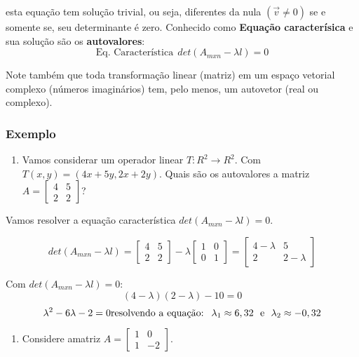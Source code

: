\documentclass[
]{book}
\providecommand{\tightlist}{%
  \setlength{\itemsep}{0pt}\setlength{\parskip}{0pt}}
\begin{document}
esta equação tem solução trivial, ou seja, diferentes da nula \((\vec{v}\neq 0 )\) se e somente se, seu determinante é zero. Conhecido como \textbf{Equação caracterísica} e sua solução são os \textbf{autovalores}:
\begin{equation}
    \mbox{Eq. Característica}\ \  det(A_{mxn}-\lambda l)=0  
    \label{eq:eqcarac}
\end{equation}

Note também que toda transformação linear (matriz) em um espaço
vetorial complexo (números imaginários) tem, pelo menos, um autovetor (real ou complexo).

\hypertarget{exautovetor1}{%
\subsubsection{Exemplo}\label{exautovetor1}}

\begin{enumerate}
\def\labelenumi{\arabic{enumi}.}
\tightlist
\item
  Vamos considerar um operador linear \textbf{\(T: R^2 \rightarrow R^2\)}. Com \(T(x,y)=(4x+5y,2x+2y)\). Quais são os autovalores a matriz \(A=\begin{bmatrix} 4 &5 \\ 2 &2 \end{bmatrix}\)?
\end{enumerate}

Vamos resolver a equação característica \(det(A_{mxn}-\lambda l)=0\).

\[det(A_{mxn}-\lambda l)=\begin{bmatrix}
4 &5 \\ 
2 &2 
\end{bmatrix} - \lambda \begin{bmatrix}
1 &0 \\ 
0 &1 
\end{bmatrix} = \begin{bmatrix}
4-\lambda &5 \\ 
2 &2-\lambda 
\end{bmatrix}\]

Com \(det(A_{mxn}-\lambda l)=0:\)
\[(4-\lambda)(2-\lambda)-10=0 \]
\[\lambda^2-6\lambda-2=0 \\ \mbox{resolvendo a equação: } \ 
\lambda_1 \approx 6,32 \  \ \mbox{e} \ \ \lambda_2 \approx -0,32\]

\begin{enumerate}
\def\labelenumi{\arabic{enumi}.}
\setcounter{enumi}{1}
\tightlist
\item
  Considere amatriz \(A=\begin{bmatrix} 1 &0 \\ 1 &-2 \end{bmatrix}\).
\end{enumerate}
\end{document}

